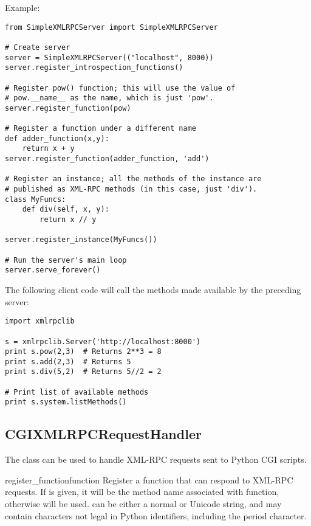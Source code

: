 Example:

\begin{verbatim}
from SimpleXMLRPCServer import SimpleXMLRPCServer

# Create server
server = SimpleXMLRPCServer(("localhost", 8000))
server.register_introspection_functions()

# Register pow() function; this will use the value of 
# pow.__name__ as the name, which is just 'pow'.
server.register_function(pow)

# Register a function under a different name
def adder_function(x,y):
    return x + y
server.register_function(adder_function, 'add')

# Register an instance; all the methods of the instance are 
# published as XML-RPC methods (in this case, just 'div').
class MyFuncs:
    def div(self, x, y): 
        return x // y
    
server.register_instance(MyFuncs())

# Run the server's main loop
server.serve_forever()
\end{verbatim}

The following client code will call the methods made available by 
the preceding server:

\begin{verbatim}
import xmlrpclib

s = xmlrpclib.Server('http://localhost:8000')
print s.pow(2,3)  # Returns 2**3 = 8
print s.add(2,3)  # Returns 5
print s.div(5,2)  # Returns 5//2 = 2

# Print list of available methods
print s.system.listMethods()
\end{verbatim}


\subsection{CGIXMLRPCRequestHandler}

The  class can be used to 
handle XML-RPC requests sent to Python CGI scripts.

\begin{methoddesc}{register_function}{function}
Register a function that can respond to XML-RPC requests. If 
 is given, it will be the method name associated with 
function, otherwise  will be used. 
can be either a normal or Unicode string, and may contain 
characters not legal in Python identifiers, including the period
character. 
\end{methoddesc}

